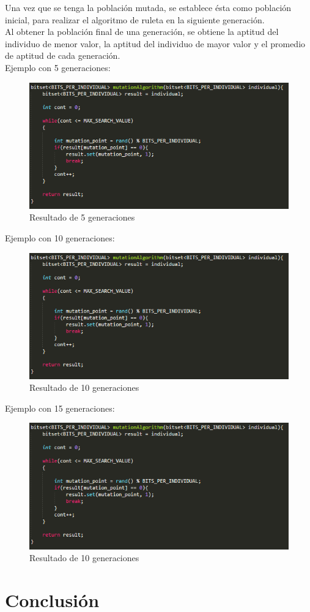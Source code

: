 \documentclass[11pt,letterpaper]{article}
\begin{document}
Una vez que se tenga la población mutada, se establece ésta como población inicial, para realizar el algoritmo de ruleta en la siguiente generación.\\

Al obtener la población final de una generación, se obtiene la aptitud del individuo de menor valor, la aptitud del individuo de mayor valor y el promedio de aptitud de cada generación.\\

Ejemplo con 5 generaciones:
\begin{figure}[H]
	\centering
	\includegraphics[scale = 1]{images/mutacion}
	\caption{Resultado de 5 generaciones}
\end{figure}

Ejemplo con 10 generaciones:
\begin{figure}[H]
	\centering
	\includegraphics[scale = 1]{images/mutacion}
	\caption{Resultado de 10 generaciones}
\end{figure}

Ejemplo con 15 generaciones:
\begin{figure}[H]
	\centering
	\includegraphics[scale = 1]{images/mutacion}
	\caption{Resultado de 10 generaciones}
\end{figure}


\section*{Conclusión}
\end{document}
